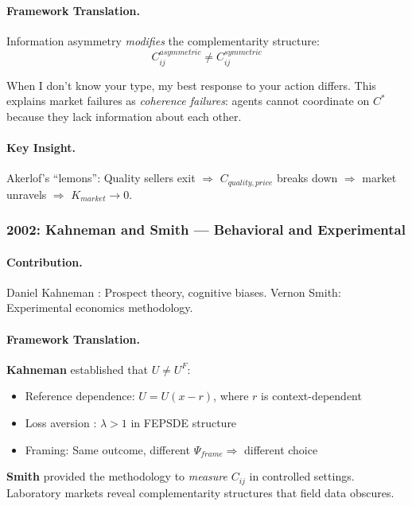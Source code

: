 \paragraph{Framework Translation.}
Information asymmetry \emph{modifies} the complementarity structure:
\begin{equation}
  C_{ij}^{asymmetric} \neq C_{ij}^{symmetric}
\end{equation}

When I don't know your type, my best response to your action differs.
This explains market failures as \emph{coherence failures}:
agents cannot coordinate on $C^*$ because they lack information about each other.

\paragraph{Key Insight.}
Akerlof's ``lemons'': Quality sellers exit $\Rightarrow$ $C_{quality, price}$ breaks down
$\Rightarrow$ market unravels $\Rightarrow$ $K_{market} \to 0$.

\subsubsection{2002: Kahneman and Smith --- Behavioral and Experimental}

\paragraph{Contribution.}
Daniel Kahneman \citep{kahneman2011}: Prospect theory, cognitive biases.
Vernon Smith: Experimental economics methodology.

\paragraph{Framework Translation.}
\textbf{Kahneman} established that $U \neq U^F$:
\begin{itemize}
  \item Reference dependence: $U = U(x - r)$, where $r$ is context-dependent
  \item Loss aversion \citep{tverskykahneman1991}: $\lambda > 1$ in FEPSDE structure
  \item Framing: Same outcome, different $\Psi_{frame} \Rightarrow$ different choice
\end{itemize}

\textbf{Smith} provided the methodology to \emph{measure} $C_{ij}$ in controlled settings.
Laboratory markets reveal complementarity structures that field data obscures.

